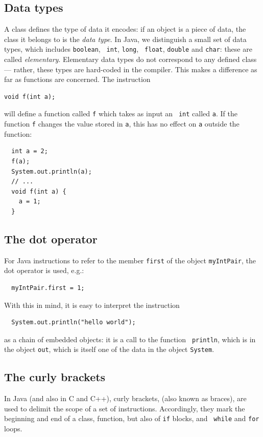 \documentclass[a4paper]{book}
\theoremstyle{changebreak}                %
\begin{document}
\subsection{Data types}
A class defines the type of data it encodes: if an object is a piece
of data, the class it belongs to is the {\it data
  type}. In Java, we distinguish a small set of data
types, which includes {\tt boolean}, {\tt
  int}, {\tt long}, {\tt
  float}, {\tt double} and {\tt char}: these are called {\it
  elementary}. Elementary data types do
not correspond to any defined class --- rather, these types are
hard-coded in the compiler. This makes a difference as
far as functions are concerned. The instruction
\begin{verbatim}
void f(int a);
\end{verbatim}
will define a function called {\tt f} which takes as input an {\tt
  int} called {\tt a}. If the function {\tt f} changes the value
stored in {\tt a}, this has no effect on {\tt a} outside the function:
\begin{verbatim}
  int a = 2;
  f(a);
  System.out.println(a);
  // ...
  void f(int a) {
    a = 1;
  } 
\end{verbatim}

\subsection{The dot operator}
For Java instructions to refer to the
member {\tt first} of the object
{\tt myIntPair}, the dot
operator is used, e.g.:
\begin{verbatim}
  myIntPair.first = 1;
\end{verbatim}
With this in mind, it is easy to interpret the instruction
\begin{verbatim}
  System.out.println("hello world");
\end{verbatim}
as a chain of embedded objects: it is a call to the function {\tt
  println}, which is in the object {\tt out},
which is itself one of the data in the object 
{\tt System}.

\subsection{The curly brackets}
In Java (and also in C and C++), curly
brackets,\index{\{\}} (also known as
braces), are used to delimit the scope of a
set of instructions. Accordingly, they mark the beginning and end of a
class, function, but also of {\tt if} blocks, and {\tt
  while} and {\tt for}
loops.
\end{document}
